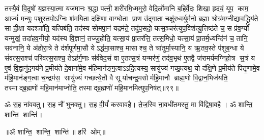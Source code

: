 तस्यै॒वं  वि॒दुषो॑ य॒ज्ञस्या॒त्मा यज॑मानः श्र॒द्धा पत्नी॒ शरी॑रमि॒ध्ममुरो॒ वेदि॒र्लोमा॑नि ब॒\ar{}हिर्वे॒दः  शिखा॒ हृद॑यं॒ यूप॒ काम॒ आज्यं॑ म॒न्युः प॒शुस्तपो॒ऽग्निः  श॑मयि॒ता दक्षि॑णा॒ वाग्घोता प्रा॒ण उ॑द्गा॒ता चक्षु॑रध्व॒र्युर्मनो॒ ब्रह्मा॒ श्रोत्र॑म॒ग्नीद्याव॒द्ध्रिय॑ते॒ सा दी॒क्षा यदश्ञा॑ति॒ यत्पिब॑ति॒ तद॑स्य सोमपा॒नं यद्रम॑ते॒ तदु॑प॒सदो॒ यत्स॒ञ्चर॑त्युप॒विश॑त्यु॒त्तिष्ठ॑ते च॒ स प्र॑व॒र्ग्यो॑ यन्मुखं॒ तदा॑हव॒नीयो॒ यद॑स्य वि॒ज्ञानं॒ तज्जु॒होति॒ यत्सा॒यं प्रा॒तर॑त्ति॒ तत्स॒मिधो॒ यत्सा॒यं प्रा॒तर्म॒ध्यन्दि॑नं च॒ तानि॒ सव॑नानि॒ ये अ॑होरा॒त्रे ते द॑र्\mbox{}शपूर्णमा॒सौ येऽर्द्धमा॒साश्च॒ मासाश्च॒ ते चा॑तुर्मा॒स्यानि॒ य ऋ॒तव॒स्ते प॑शुब॒न्धा ये सं॑वत्स॒राश्च॑ परिवत्स॒राश्च॒ तेऽह॑र्ग॒णाः स॑र्ववेद॒सं वा ए॒तत्स॒त्रं यन्मर॑णं॒ तद॑व॒भृथ॑ ए॒तद्वै ज॑रामर्यमग्निहो॒त्र स॒त्रं य ए॒वं  वि॒द्वानु॑द॒गय॑ने प्र॒मीय॑ते दे॒वाना॑मे॒व म॑हि॒मान॑ङ्ग॒त्वाऽऽदि॒त्यस्य॒ सायु॑ज्यं गच्छ॒त्यथ॒ यो द॑क्षि॒णे प्र॒मीय॑ते पितृ॒णामे॒व म॑हि॒मान॑ङ्ग॒त्वा च॒न्द्रम॑स॒ सायु॑ज्यं गच्छत्ये॒तौ वै सूर्याचन्द्र॒मसोर्महि॒मानौ ब्राह्म॒णो वि॒द्वान॒भिज॑यति॒ तस्माद्ब्र॒ह्मणो॑ महि॒मान॑माप्नोति॒ तस्माद्ब्र॒ह्मणो॑ महि॒मान॑मित्युप॒निष॑त्॥९९॥
\anuvakamend

ॐ स॒ह ना॑ववतु। स॒ह नौ॑ भुनक्तु। स॒ह वी॒र्यं॑ करवावहै। ते॒ज॒स्वि ना॒वधी॑तमस्तु॒ मा वि॑द्विषा॒वहै। ॐ शान्ति॒ शान्ति॒ शान्ति॑॥

\centerline{॥ॐ शान्ति॒ शान्ति॒ शान्ति॑॥ हरि॑ ओम्॥}

\closesection
\clearpage
